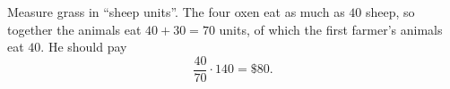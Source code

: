 Measure grass in ``sheep units''. The four oxen eat as much as $40$ sheep, so together the animals eat $40+30=70$ units, of which the first farmer's animals eat $40$. He should pay
\[
\dfrac{40}{70}\cdot140=\boxed{\$80}.
\]
